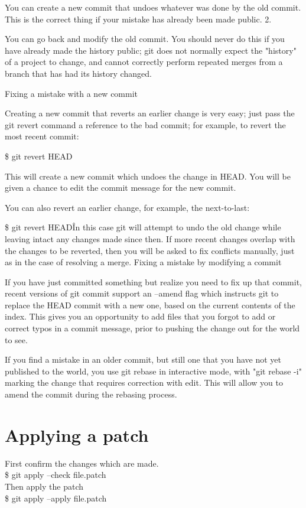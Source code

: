 \documentclass[a4paper,10pt]{article}
\begin{document}
You can create a new commit that undoes whatever was done by the old commit. This is the correct thing if your mistake has already been made public.
2.

You can go back and modify the old commit. You should never do this if you have already made the history public; git does not normally expect the "history" of a project to change, and cannot correctly perform repeated merges from a branch that has had its history changed.

Fixing a mistake with a new commit

Creating a new commit that reverts an earlier change is very easy; just pass the git revert command a reference to the bad commit; for example, to revert the most recent commit:

\$ git revert HEAD

This will create a new commit which undoes the change in HEAD. You will be given a chance to edit the commit message for the new commit.

You can also revert an earlier change, for example, the next-to-last:

\$ git revert HEAD\^
In this case git will attempt to undo the old change while leaving intact any changes made since then. If more recent changes overlap with the changes to be reverted, then you will be asked to fix conflicts manually, just as in the case of resolving a merge.
Fixing a mistake by modifying a commit

If you have just committed something but realize you need to fix up that commit, recent versions of git commit support an --amend flag which instructs git to replace the HEAD commit with a new one, based on the current contents of the index. This gives you an opportunity to add files that you forgot to add or correct typos in a commit message, prior to pushing the change out for the world to see.

If you find a mistake in an older commit, but still one that you have not yet published to the world, you use git rebase in interactive mode, with "git rebase -i" marking the change that requires correction with edit. This will allow you to amend the commit during the rebasing process.

\section{Applying a patch}
First confirm the changes which are made.\\
\$ git apply --check file.patch\\
Then apply the patch\\
\$ git apply --apply file.patch 
\end{document}
